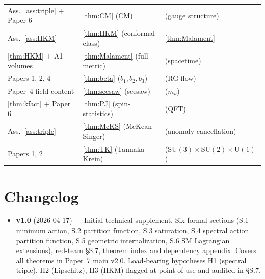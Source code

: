 \documentclass[11pt,a4paper]{article}
\theoremstyle{definition}
\newcommand{\SU}[1]{\mathrm{SU}(#1)}
\newcommand{\U}[1]{\mathrm{U}(#1)}
\begin{document}
\begin{center}
\begin{tabular}{@{}p{3cm}p{8cm}p{3cm}@{}}
Ass.~\ref{ass:triple} + Paper 6  & \ref{thm:CM} (CM)                            & (gauge structure)\\
Ass.~\ref{ass:HKM}               & \ref{thm:HKM} (conformal class)              & \ref{thm:Malament}\\
\ref{thm:HKM} + A1 volumes       & \ref{thm:Malament} (full metric)             & (spacetime)\\
Papers 1, 2, 4                   & \ref{thm:beta} ($b_1, b_2, b_3$)              & (RG flow)\\
Paper~4 field content            & \ref{thm:seesaw} (seesaw)                    & ($m_\nu$)\\
\ref{thm:kfact} + Paper 6        & \ref{thm:PJ} (spin-statistics)               & (QFT)\\
Ass.~\ref{ass:triple}            & \ref{thm:McKS} (McKean--Singer)              & (anomaly cancellation)\\
Papers 1, 2                      & \ref{thm:TK} (Tannaka--Krein)                & ($\SU{3}\times\SU{2}\times\U{1}$)\\
\bottomrule
\end{tabular}
\end{center}

\medskip

\section*{Changelog}
\begin{itemize}[leftmargin=*,nosep]
\item \textbf{v1.0} (2026-04-17) --- Initial technical supplement.  Six formal sections (S.1 minimum action, S.2 partition function, S.3 saturation, S.4 spectral action = partition function, S.5 geometric internalization, S.6 SM Lagrangian extensions), red-team §S.7, theorem index and dependency appendix.  Covers all theorems in Paper~7 main v2.0.  Load-bearing hypotheses H1 (spectral triple), H2 (Lipschitz), H3 (HKM) flagged at point of use and audited in §S.7.
\end{itemize}
\end{document}
